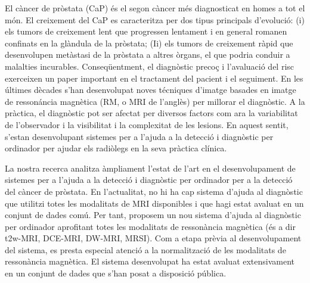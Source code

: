 \begin{abstractCatalan}

El c\`ancer de pr\`ostata (CaP) \'es el segon c\`ancer m\'es diagnosticat en homes a tot el m\'on.
El creixement del CaP es caracteritza per dos tipus principals d'evoluci\'o: (i) els tumors de creixement lent que progressen lentament i en general romanen confinats en la gl\`andula de la pr\`ostata; (Ii) els tumors de creixement r\`apid que desenvolupen met\`astasi de la pr\`ostata a altres \`organs, el que podria conduir a malalties incurables.
Conseqüentment, el diagn\`ostic preco\c{c} i l'avaluaci\'o del risc exerceixen un paper important en el tractament del pacient i el seguiment.
En les \'ultimes dècades s'han desenvolupat noves t\'ecniques d'imatge basades en imatge de resson\'ancia magn\`etica (RM, o MRI de l'angl\`es) per millorar el diagnòstic.
A la pr\`actica, el diagn\`ostic pot ser afectat per diversos factors com ara la variabilitat de l'observador i la visibilitat i la complexitat de les lesions.
En aquest sentit, s'estan desenvolupant sistemes per a l'ajuda a la detecci\'o i diagn\`ostic per ordinador per ajudar els radiòlegs en la seva pràctica clínica.

La nostra recerca analitza \`ampliament l'estat de l'art en el desenvolupament de sistemes per a l'ajuda a la detecci\'o i diagn\`ostic per ordinador per a la detecci\'o del c\`ancer de pr\`ostata.
En l'actualitat, no hi ha cap sistema d'ajuda al diagn\`ostic que utilitzi totes les modalitats de MRI disponibles i que hagi estat avaluat en un conjunt de dades com\'u.
Per tant, proposem un nou sistema d'ajuda al diagn\`ostic per ordinador aprofitant totes les modalitats de resson\`ancia magn\`etica (\'es a dir \acs{t2w}-MRI, DCE-MRI, DW-MRI, MRSI).
Com a etapa pr\`evia al desenvolupament del sistema, es presta especial atenci\'o a la normalitzaci\'o de les modalitats de resson\`ancia magn\`etica.
El sistema desenvolupat ha estat avaluat extensivament en un conjunt de dades que s'han posat a disposició pública.
 
\end{abstractCatalan}

